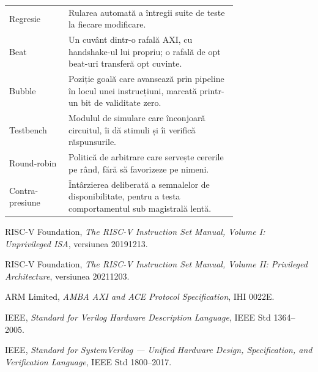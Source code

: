 \documentclass[11pt,openany]{report}
\begin{document}
\begin{table}[H]
\begin{tabular}{@{}lL{0.74\linewidth}@{}}
Regresie & Rularea automată a întregii suite de teste la fiecare modificare. \\
Beat & Un cuvânt dintr-o rafală AXI, cu handshake-ul lui propriu; o rafală de opt beat-uri transferă opt cuvinte. \\
Bubble & Poziție goală care avansează prin pipeline în locul unei instrucțiuni, marcată printr-un bit de validitate zero. \\
Testbench & Modulul de simulare care înconjoară circuitul, îi dă stimuli și îi verifică răspunsurile. \\
Round-robin & Politică de arbitrare care servește cererile pe rând, fără să favorizeze pe nimeni. \\
Contra-presiune & Întârzierea deliberată a semnalelor de disponibilitate, pentru a testa comportamentul sub magistrală lentă. \\
\bottomrule
\end{tabular}
\end{table}

\begin{thebibliography}{9}
RISC-V Foundation, \emph{The RISC-V Instruction Set Manual, Volume I:
Unprivileged ISA}, versiunea 20191213.

RISC-V Foundation, \emph{The RISC-V Instruction Set Manual, Volume II:
Privileged Architecture}, versiunea 20211203.

ARM Limited, \emph{AMBA AXI and ACE Protocol Specification}, IHI 0022E.

IEEE, \emph{Standard for Verilog Hardware Description Language},
IEEE Std 1364--2005.

IEEE, \emph{Standard for SystemVerilog --- Unified Hardware Design,
Specification, and Verification Language}, IEEE Std 1800--2017.
\end{thebibliography}
\end{document}
